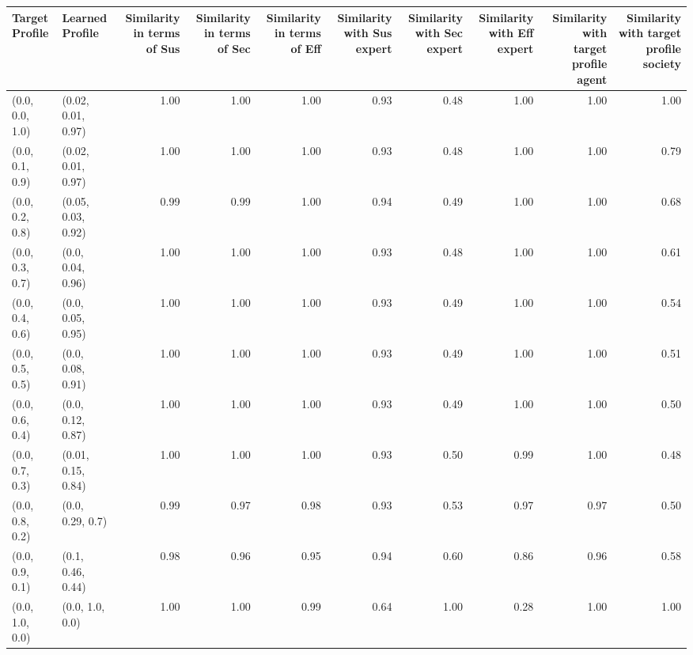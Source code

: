\begin{tabular}{llrrrrrrrr}
\toprule
Target Profile & Learned Profile & Similarity in terms of Sus & Similarity in terms of Sec & Similarity in terms of Eff & Similarity with Sus expert & Similarity with Sec expert & Similarity with Eff expert & Similarity with target profile agent & Similarity with target profile society \\
\midrule
(0.0, 0.0, 1.0) & (0.02, 0.01, 0.97) & 1.00 & 1.00 & 1.00 & 0.93 & 0.48 & 1.00 & 1.00 & 1.00 \\
(0.0, 0.1, 0.9) & (0.02, 0.01, 0.97) & 1.00 & 1.00 & 1.00 & 0.93 & 0.48 & 1.00 & 1.00 & 0.79 \\
(0.0, 0.2, 0.8) & (0.05, 0.03, 0.92) & 0.99 & 0.99 & 1.00 & 0.94 & 0.49 & 1.00 & 1.00 & 0.68 \\
(0.0, 0.3, 0.7) & (0.0, 0.04, 0.96) & 1.00 & 1.00 & 1.00 & 0.93 & 0.48 & 1.00 & 1.00 & 0.61 \\
(0.0, 0.4, 0.6) & (0.0, 0.05, 0.95) & 1.00 & 1.00 & 1.00 & 0.93 & 0.49 & 1.00 & 1.00 & 0.54 \\
(0.0, 0.5, 0.5) & (0.0, 0.08, 0.91) & 1.00 & 1.00 & 1.00 & 0.93 & 0.49 & 1.00 & 1.00 & 0.51 \\
(0.0, 0.6, 0.4) & (0.0, 0.12, 0.87) & 1.00 & 1.00 & 1.00 & 0.93 & 0.49 & 1.00 & 1.00 & 0.50 \\
(0.0, 0.7, 0.3) & (0.01, 0.15, 0.84) & 1.00 & 1.00 & 1.00 & 0.93 & 0.50 & 0.99 & 1.00 & 0.48 \\
(0.0, 0.8, 0.2) & (0.0, 0.29, 0.7) & 0.99 & 0.97 & 0.98 & 0.93 & 0.53 & 0.97 & 0.97 & 0.50 \\
(0.0, 0.9, 0.1) & (0.1, 0.46, 0.44) & 0.98 & 0.96 & 0.95 & 0.94 & 0.60 & 0.86 & 0.96 & 0.58 \\
(0.0, 1.0, 0.0) & (0.0, 1.0, 0.0) & 1.00 & 1.00 & 0.99 & 0.64 & 1.00 & 0.28 & 1.00 & 1.00 \\
\bottomrule
\end{tabular}
